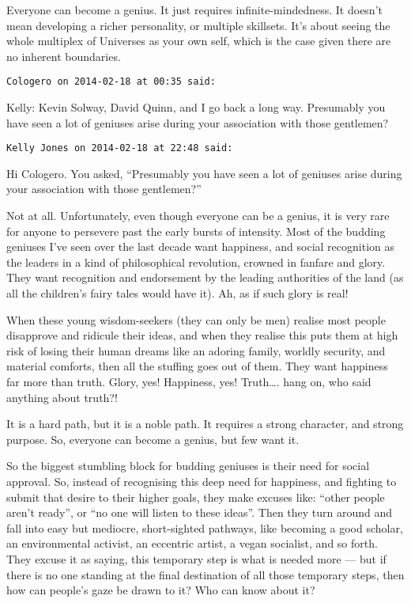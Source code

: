 \begin{footnotesize}
\begin{sffamily}
Everyone can become a genius. It just requires infinite-mindedness. It doesn't mean developing a richer personality, or multiple skillsets. It's about seeing the whole multiplex of Universes as your own self, which is the case given there are no inherent boundaries.


\hfill

\texttt{Cologero on 2014-02-18 at 00:35 said: }

Kelly: Kevin Solway, David Quinn, and I go back a long way. Presumably you have seen a lot of geniuses arise during your association with those gentlemen?


\hfill

\texttt{Kelly Jones on 2014-02-18 at 22:48 said: }

Hi Cologero. You asked, “Presumably you have seen a lot of geniuses arise during your association with those gentlemen?” 

Not at all. Unfortunately, even though everyone can be a genius, it is very rare for anyone to persevere past the early bursts of intensity. Most of the budding geniuses I've seen over the last decade want happiness, and social recognition as the leaders in a kind of philosophical revolution, crowned in fanfare and glory. They want recognition and endorsement by the leading authorities of the land (as all the children's fairy tales would have it). Ah, as if such glory is real!

When these young wisdom-seekers (they can only be men) realise most people disapprove and ridicule their ideas, and when they realise this puts them at high risk of losing their human dreams like an adoring family, worldly security, and material comforts, then all the stuffing goes out of them. They want happiness far more than truth. Glory, yes! Happiness, yes! Truth…. hang on, who said anything about truth?!

It is a hard path, but it is a noble path. It requires a strong character, and strong purpose. So, everyone can become a genius, but few want it.

So the biggest stumbling block for budding geniuses is their need for social approval. So, instead of recognising this deep need for happiness, and fighting to submit that desire to their higher goals, they make excuses like: “other people aren't ready”, or “no one will listen to these ideas”. Then they turn around and fall into easy but mediocre, short-sighted pathways, like becoming a good scholar, an environmental activist, an eccentric artist, a vegan socialist, and so forth. They excuse it as saying, this temporary step is what is needed more — but if there is no one standing at the final destination of all those temporary steps, then how can people's gaze be drawn to it? Who can know about it?


\end{sffamily}
\end{footnotesize}
